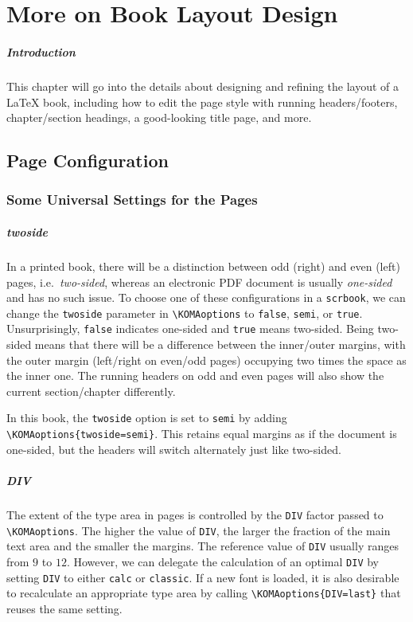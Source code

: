\chapter{More on Book Layout Design}

\paragraph{Introduction}
This chapter will go into the details about designing and refining the layout of a \LaTeX{} book, including how to edit the page style with running headers/footers, chapter/section headings, a good-looking title page, and more.

\section{Page Configuration}

\subsection{Some Universal Settings for the Pages}

\paragraph{twoside}
In a printed book, there will be a distinction between odd (right) and even (left) pages, i.e.\ \textit{two-sided}, whereas an electronic PDF document is usually \textit{one-sided} and has no such issue. To choose one of these configurations in a \texttt{scrbook}, we can change the \texttt{twoside} parameter in \texttt{\textbackslash KOMAoptions} to \texttt{false}, \texttt{semi}, or \texttt{true}. Unsurprisingly, \texttt{false} indicates one-sided and \texttt{true} means two-sided. Being two-sided means that there will be a difference between the inner/outer margins, with the outer margin (left/right on even/odd pages) occupying two times the space as the inner one. The running headers on odd and even pages will also show the current section/chapter differently.

In this book, the \texttt{twoside} option is set to \texttt{semi} by adding \texttt{\textbackslash KOMAoptions\allowbreak\{twoside=semi\}}. This retains equal margins as if the document is one-sided, but the headers will switch alternately just like two-sided.

\paragraph{DIV}
The extent of the type area in pages is controlled by the \texttt{DIV} factor passed to \texttt{\textbackslash KOMAoptions}. The higher the value of \texttt{DIV}, the larger the fraction of the main text area and the smaller the margins. The reference value of \texttt{DIV} usually ranges from $9$ to $12$. However, we can delegate the calculation of an optimal \texttt{DIV} by setting \texttt{DIV} to either \texttt{calc} or \texttt{classic}. If a new font is loaded, it is also desirable to recalculate an appropriate type area by calling \texttt{\textbackslash KOMAoptions\{DIV=last\}} that reuses the same setting.

